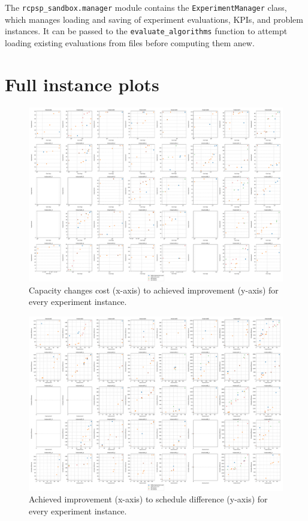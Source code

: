 The \texttt{rcpsp\_sandbox.manager} module contains the \texttt{ExperimentManager} class,
which manages loading and saving of experiment evaluations, KPIs, and problem instances.
It can be passed to the \texttt{evaluate\_algorithms} function
to attempt loading existing evaluations from files before computing them anew.

\section{Full instance plots} \label{sec:attachments/full-instance-plots}

\begin{figure}[p]
    \centering
    \includegraphics[angle=270, width=\textwidth]{img/exp_cost_improv.pdf}
    \caption{
        Capacity changes cost (x-axis) to achieved 
        improvement (y-axis) for every experiment instance.
        }
    \label{fig:exp-full/cost-improv}
\end{figure}

\begin{figure}[p]
    \centering
    \includegraphics[angle=90,width=\textwidth]{img/exp_improv_diff.pdf}
    \caption{
        Achieved improvement (x-axis) to schedule
        difference (y-axis) for every experiment instance.
        }
    \label{fig:exp-full/improv-diff}
\end{figure}

